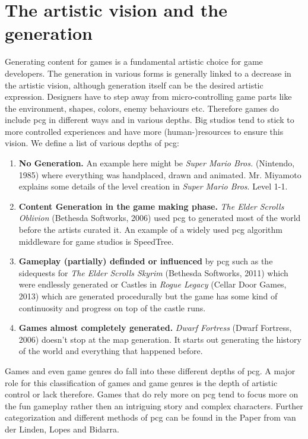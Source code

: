 \documentclass[10pt,a4paper]{article}
\begin{document}
\section{The artistic vision and the generation}\label{sec:visionVSgeneration}
Generating content for games is a fundamental artistic choice for game developers. The generation in various forms is generally linked to a decrease in the artistic vision, although generation itself can be the desired artistic expression. Designers have to step away from micro-controlling game parts like the environment, shapes, colors, enemy behaviours etc. Therefore games do include \gls{pcg} in different ways and in various depths. Big studios tend to stick to more controlled experiences and have more (human-)resources to ensure this vision. We define a list of various depths of \gls{pcg}:
\begin{enumerate}
\item \textbf{No Generation.} An example here might be \textit{Super Mario Bros.} (Nintendo, 1985) where everything was handplaced, drawn and animated. Mr. Miyamoto explains some details of the level creation in \textit{Super Mario Bros}. Level 1-1\cite{EurogamerMiyamotoInterview}.
\item \textbf{Content Generation in the game making phase.} \textit{The Elder Scrolls Oblivion} (Bethesda Softworks, 2006) used \gls{pcg} to generated most of the world before the artists curated it\cite{PCGamerCarterInterview}. An example of a widely used \gls{pcg} algorithm middleware for game studios is SpeedTree\cite{SpeedTree}.
\item \textbf{Gameplay (partially) definded or influenced} by \gls{pcg} such as the sidequests for \textit{The Elder Scrolls Skyrim} (Bethesda Softworks, 2011) which were endlessly generated\cite{Bertz2011} or Castles in \textit{Rogue Legacy} (Cellar Door Games, 2013) which are generated procedurally but the game has some kind of continuosity and progress on top of the castle runs\cite{Stanton2013}.
\item \textbf{Games almost completely generated.} \textit{Dwarf Fortress} (Dwarf Fortress, 2006) doesn't stop at the map generation. It starts out generating the history of the world and everything that happened before\cite{Champandard2012}.
\end{enumerate}
Games and even game genres do fall into these different depths of \gls{pcg}. A major role for this classification of games and game genres is the depth of artistic control or lack therefore\cite{VanderLinden2014}. Games that do rely more on \gls{pcg} tend to focus more on the fun gameplay rather then an intriguing story and complex characters. Further categorization and different methods of \gls{pcg} can be found in the Paper from van der Linden, Lopes and Bidarra\cite{VanderLinden2014}.
\end{document}
